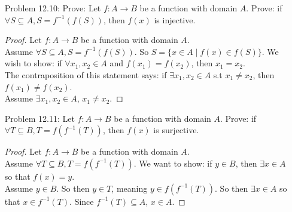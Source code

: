\documentclass{article}
\theoremstyle{claim}
\theoremstyle{definition}
\begin{document}
\begin{enumerate}
    \item[Problem 12.10:] Prove: Let $f : A \rightarrow B$ be a function with domain $A$. Prove: if $\forall S \subseteq A, S = f^{-1}(f(S))$, then $f(x)$ is injective.
        \begin{proof}
            Let $f: A \rightarrow B$ be a function with domain $A$.\\
            Assume $\forall S \subseteq A, S = f^{-1}(f(S))$. So $S = \{ x \in A \mid f(x) \in f(S)\}$. We wish to show: if $\forall x_1, x_2 \in A$ and $f(x_1) = f(x_2)$, then $x_1 = x_2$.\\
            The contraposition of this statement says: if $\exists x_1 , x_2 \in A$ s.t $x_1 \ne x_2$, then $f(x_1) \ne f(x_2)$.\\
            Assume $\exists x_1, x_2 \in A$, $x_1 \ne x_2$.
        \end{proof}
    \item[Problem 12.11:] Let $f: A \rightarrow B$ be a function with domain $A$. Prove: if $\forall T \subseteq B, T = f(f^{-1}(T))$, then $f(x)$ is surjective.
        \begin{proof}
            Let $f : A \rightarrow B$ be a function with domain $A$.\\
            Assume $\forall T \subseteq B, T = f(f^{-1}(T))$. We want to show: if $y \in B$, then $\exists x \in A$ so that $f(x) = y$.\\
            Assume $y \in B$. So then $y \in T$, meaning $y \in f(f^{-1}(T))$. So then $\exists x \in A$ so that $x \in f^{-1}(T)$. Since $f^{-1}(T) \subseteq A$, $x \in A$. 
        \end{proof}
\end{enumerate}
\end{document}
